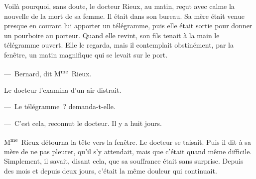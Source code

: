\documentclass[french,twoside]{book} %
\begin{document}
Voilà pourquoi, sans doute, le docteur Rieux, au matin, reçut avec calme la nouvelle de la mort de sa femme. Il était dans son bureau. Sa mère était venue presque en courant lui apporter un télégramme, puis elle était sortie pour donner un pourboire au porteur. Quand elle revint, son fils tenait à la main le télégramme ouvert. Elle le regarda, mais il contemplait obstinément, par la fenêtre, un matin magnifique qui se levait sur le port.\par
— Bernard, dit M\textsuperscript{me} Rieux.\par
Le docteur l’examina d’un air distrait.\par
— Le télégramme ? demanda-t-elle.\par
— C’est cela, reconnut le docteur. Il y a huit jours.\par
M\textsuperscript{me} Rieux détourna la tête vers la fenêtre. Le docteur se taisait. Puis il dit à sa mère de ne pas pleurer, qu’il s’y attendait, mais que c’était quand même difficile. Simplement, il savait, disant cela, que sa souffrance était sans surprise. Depuis des mois et depuis deux jours, c’était la même douleur qui continuait.
\end{document}
